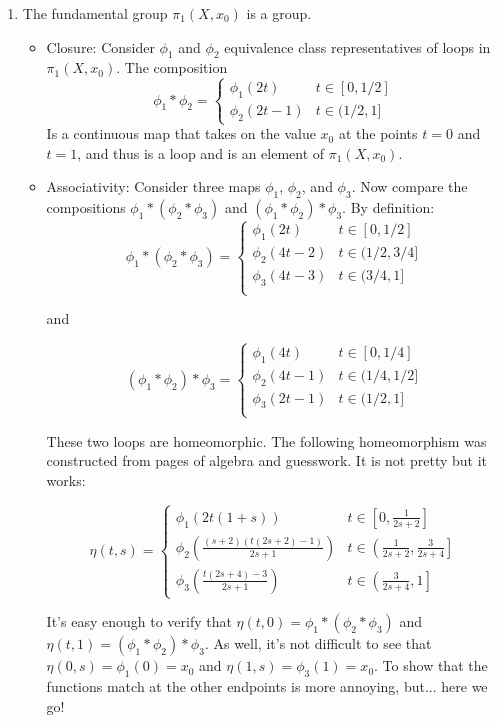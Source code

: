 \documentclass[12pt]{report}
\begin{document}
\begin{enumerate}
\item The fundamental group $\pi_1(X,x_0)$ is a group.
\begin{itemize}
  \item Closure: Consider $\phi_1$ and $\phi_2$ equivalence class representatives of loops in $\pi_1(X,x_0)$.
        The composition \[ \phi_1 * \phi_2 = \begin{cases}
        \phi_1(2t) & t \in [0,1/2] \\
        \phi_2(2t-1) & t \in (1/2,1]
        \end{cases} \]
        Is a continuous map that takes on the value $x_0$ at the points $t = 0$ and $t = 1$, and thus is a loop and is
        an element of $\pi_1(X,x_0)$.

  \item Associativity: Consider three maps $\phi_1$, $\phi_2$, and $\phi_3$. Now compare the compositions
  $\phi_1 * (\phi_2 * \phi_3)$ and $(\phi_1 * \phi_2) * \phi_3$. By definition:
  \[ \phi_1 * (\phi_2 * \phi_3) = \begin{cases}
  \phi_1(2t) & t \in [0,1/2] \\
  \phi_2(4t-2) & t \in (1/2,3/4]\\
  \phi_3(4t-3) & t \in (3/4,1]\\
  \end{cases} \]

  and

  \[ (\phi_1 * \phi_2) * \phi_3 = \begin{cases}
  \phi_1(4t) & t \in [0,1/4] \\
  \phi_2(4t-1) & t \in (1/4,1/2]\\
  \phi_3(2t-1) & t \in (1/2,1]\\
  \end{cases} \]

  These two loops are homeomorphic. The following homeomorphism was constructed from pages of algebra and guesswork.
  It is not pretty but it works:

  \[ \eta(t,s) = \begin{cases}
  \phi_1\left(2t(1+s)\right)                       & t \in \left[0,\frac{1}{2s+2}\right] \\
  \phi_2\left(\frac{(s+2)(t(2s+2)-1)}{2s+1}\right) & t \in \left(\frac{1}{2s+2},\frac{3}{2s+4}\right]\\
  \phi_3\left(\frac{t(2s+4)-3}{2s+1}\right)        & t \in \left(\frac{3}{2s+4} ,1\right]
  \end{cases} \]

  It's easy enough to verify that $\eta(t,0) = \phi_1 * (\phi_2 * \phi_3)$ and $\eta(t,1) = (\phi_1 * \phi_2) * \phi_3$.
  As well, it's not difficult to see that $\eta(0,s) = \phi_1(0) = x_0$ and $\eta(1,s) = \phi_3(1) = x_0$. To show that
  the functions match at the other endpoints is more annoying, but... here we go!


\end{itemize}
\end{enumerate}
\end{document}

